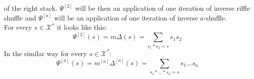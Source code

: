 \documentclass[a4paper, 12pt]{article}
\begin{document}
of the right stack. $\Psi^{[2]}$ will be then an application of one iteration of inverse riffle shuffle and
$\Psi^{[a]}$ will be an application of one iteration of inverse $a$-shuffle.\\
For every $s \in \mathcal{X}^*$ it looks like this:
\begin{equation*}
    \Psi^{[2]}(s) = m\Delta(s) =
    \sum_{s_1*s_2=s}s_1s_2
\end{equation*}
In the similar way for every $s \in \mathcal{X}^*$:
\begin{equation*}
    \Psi^{[a]}(s) = m^{[a]}\Delta^{[a]}(s) =
    \sum_{s_1*\dots *s_a=s}s_1\dots s_a
\end{equation*}

\end{document}
